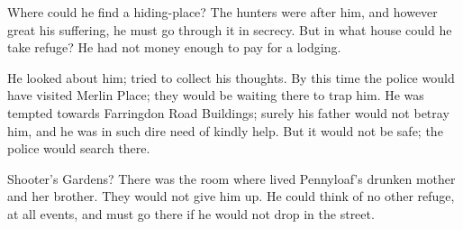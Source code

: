 Where could he find a hiding-place? The hunters were after him, and
however great his suffering, he must go through it in secrecy. But in
what house could he take refuge? He had not money enough to pay for a
lodging.

He looked about him; tried to collect his thoughts. By this time the
police would have visited Merlin Place; they would be waiting there to
trap him. He was tempted towards Farringdon Road Buildings; surely his
father would not betray him, and he was in such dire need of kindly
help. But it would not be safe; the police would search there.

Shooter's Gardens? There was the room where lived Pennyloaf's drunken
mother and her brother. They would not give him up. He could think of no
other refuge, at all events, and must go there if he would not drop in
the street.
